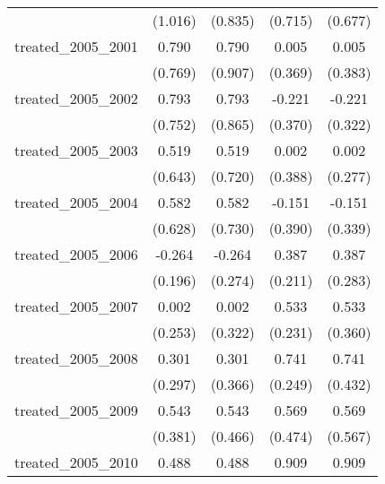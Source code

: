 {\begin{tabular}{l*{4}{c}}
            &     (1.016)         &     (0.835)         &     (0.715)         &     (0.677)         \\
[1em]
treated\_2005\_2001&       0.790         &       0.790         &       0.005         &       0.005         \\
            &     (0.769)         &     (0.907)         &     (0.369)         &     (0.383)         \\
[1em]
treated\_2005\_2002&       0.793         &       0.793         &      -0.221         &      -0.221         \\
            &     (0.752)         &     (0.865)         &     (0.370)         &     (0.322)         \\
[1em]
treated\_2005\_2003&       0.519         &       0.519         &       0.002         &       0.002         \\
            &     (0.643)         &     (0.720)         &     (0.388)         &     (0.277)         \\
[1em]
treated\_2005\_2004&       0.582         &       0.582         &      -0.151         &      -0.151         \\
            &     (0.628)         &     (0.730)         &     (0.390)         &     (0.339)         \\
[1em]
treated\_2005\_2006&      -0.264         &      -0.264         &       0.387         &       0.387         \\
            &     (0.196)         &     (0.274)         &     (0.211)         &     (0.283)         \\
[1em]
treated\_2005\_2007&       0.002         &       0.002         &       0.533\sym{*}  &       0.533         \\
            &     (0.253)         &     (0.322)         &     (0.231)         &     (0.360)         \\
[1em]
treated\_2005\_2008&       0.301         &       0.301         &       0.741\sym{**} &       0.741         \\
            &     (0.297)         &     (0.366)         &     (0.249)         &     (0.432)         \\
[1em]
treated\_2005\_2009&       0.543         &       0.543         &       0.569         &       0.569         \\
            &     (0.381)         &     (0.466)         &     (0.474)         &     (0.567)         \\
[1em]
treated\_2005\_2010&       0.488         &       0.488         &       0.909\sym{*}  &       0.909         \\

\end{tabular}}

